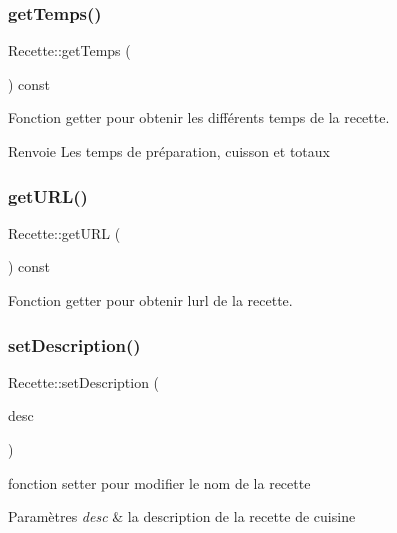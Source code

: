 \subsubsection{\texorpdfstring{get\+Temps()}{getTemps()}}
{\footnotesize\ttfamily Recette\+::get\+Temps (\begin{DoxyParamCaption}{ }\end{DoxyParamCaption}) const}



Fonction getter pour obtenir les différents temps de la recette. 

\begin{DoxyReturn}{Renvoie}
Les temps de préparation, cuisson et totaux 
\end{DoxyReturn}
\mbox{\label{classRecette_ab06006324a8201e9967b53273dbf2751}} 
\subsubsection{\texorpdfstring{get\+U\+R\+L()}{getURL()}}
{\footnotesize\ttfamily Recette\+::get\+U\+RL (\begin{DoxyParamCaption}{ }\end{DoxyParamCaption}) const}



Fonction getter pour obtenir l\textquotesingle{}url de la recette. 

\mbox{\label{classRecette_afb1113cbbe6f3a0cda8eb47a5c9025a4}} 
\subsubsection{\texorpdfstring{set\+Description()}{setDescription()}}
{\footnotesize\ttfamily Recette\+::set\+Description (\begin{DoxyParamCaption}\item[{const Q\+String \&}]{desc }\end{DoxyParamCaption})}



fonction setter pour modifier le nom de la recette 


\begin{DoxyParams}{Paramètres}
{\em desc} & la description de la recette de cuisine \\
\hline
\end{DoxyParams}
\mbox{\label{classRecette_a3a5b4231baeeae0a30588d1ca29c7e4e}} 
